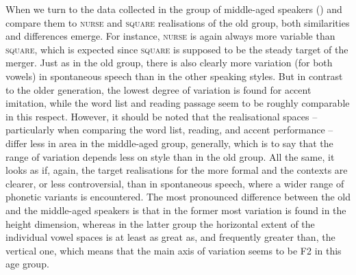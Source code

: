 When we turn to the data collected in the group of middle-aged speakers () and compare them to \textsc{nurse} and \textsc{square} realisations of the old group, both similarities and differences emerge.
For instance, \textsc{nurse} is again always more variable than \textsc{square}, which is expected since \textsc{square} is supposed to be the steady target of the merger.
Just as in the old group, there is also clearly more variation (for both vowels) in spontaneous speech than in the other speaking styles.
But in contrast to the older generation, the lowest degree of variation is found for accent imitation, while the word list and reading passage seem to be roughly comparable in this respect.
However, it should be noted that the realisational spaces -- particularly when comparing the word list, reading, and accent performance -- differ less in area in the middle-aged group, generally, which is to say that the range of variation depends less on style than in the old group.
All the same, it looks as if, again, the target realisations for the more formal and the  contexts are clearer, or less controversial, than in spontaneous speech, where a wider range of phonetic variants is encountered.
The most pronounced difference between the old and the middle-aged speakers is that in the former most variation is found in the height dimension, whereas in the latter group the horizontal extent of the individual vowel spaces is at least as great as, and frequently greater than, the vertical one, which means that the main axis of variation seems to be F2 in this age group.


